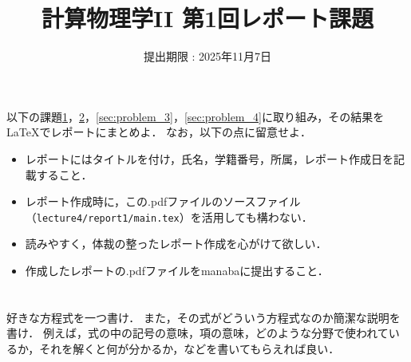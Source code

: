 \documentclass[a4paper,12pt]{jsarticle}
\title{計算物理学II 第1回レポート課題}
\date{提出期限 : 2025年11月7日}
\begin{document}
\maketitle

以下の課題\ref{sec:problem_1}，\ref{sec:problem_2}，\ref{sec:problem_3}，\ref{sec:problem_4}に取り組み，その結果を\LaTeX でレポートにまとめよ．
なお，以下の点に留意せよ．
\begin{itemize}
    \item レポートにはタイトルを付け，氏名，学籍番号，所属，レポート作成日を記載すること．
    \item レポート作成時に，この.pdfファイルのソースファイル（\texttt{lecture4/report1/main.tex}）を活用しても構わない．
    \item 読みやすく，体裁の整ったレポート作成を心がけて欲しい．
    \item 作成したレポートの.pdfファイルをmanabaに提出すること．
\end{itemize}

\section{}
\label{sec:problem_1}

好きな方程式を一つ書け．
また，その式がどういう方程式なのか簡潔な説明を書け．
例えば，式の中の記号の意味，項の意味，どのような分野で使われているか，それを解くと何が分かるか，などを書いてもらえれば良い．

\section{}
\label{sec:problem_2}
\end{document}
